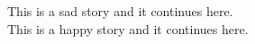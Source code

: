 \documentclass{article}
\begin{document}
This is a sad story  and it continues here.\\
This is a happy story  and it continues here.
\end{document}

